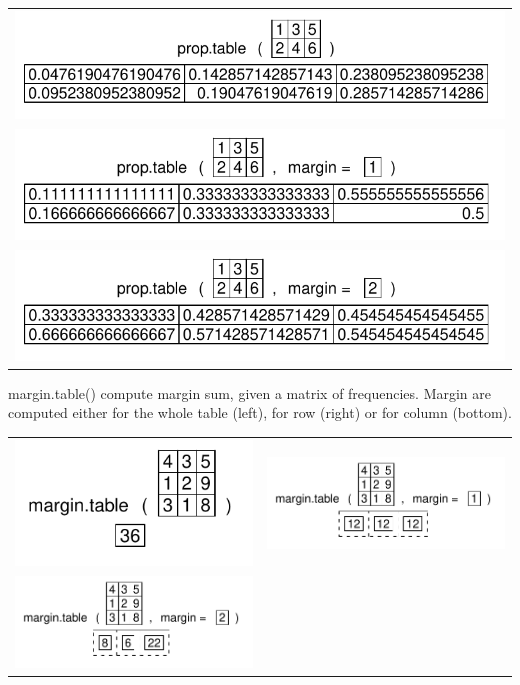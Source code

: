 \documentclass[pdflatex]{article}
\begin{document}
\begin{tabular}{c}
\includegraphics{prop_table1}\\
\includegraphics{prop_table_row}\\
\includegraphics{prop_table_column}
\end{tabular}

margin.table() compute margin sum, given a matrix of frequencies. Margin are
computed either for the whole table (left), for row (right) or for column
(bottom).

\begin{tabular}{cc}
\includegraphics{margin_table1} & \includegraphics{margin_table_row}\\
\includegraphics{margin_table_column} &
\end{tabular}
\end{document}
